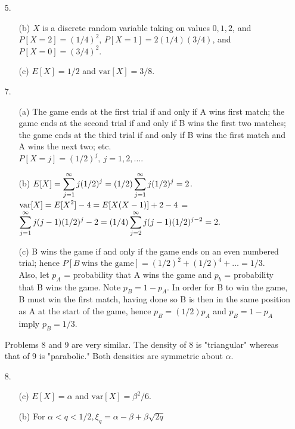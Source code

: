 \begin{enumerate}
	\item[5.] \begin{enumerate}
		
		\item[(b)] $X$ is a discrete random variable taking on values $0, 1, 2$, and $P[X=2]=(1/4)^2$, $P[X=1]= 2(1/4)(3/4)$, and $P[X=0]=(3/4)^2$. 
		
		\item[(c)] $E[X]=1/2$ and $\text{var}[X]=3/8$.
		
		\end{enumerate}
		
	\item[7.] \begin{enumerate}
		\item[(a)] The game ends at the first trial if and only if A wins first match; the game ends at the second trial if and only if B wins the first two matches; the game ends at the third trial if and only if B wins the first match and A wins the next two; etc. \\
		$P[X=j] = (1/2)^j,\ j = 1,2, \ldots.$
		
		\item[(b)] $\displaystyle E[X] = \sum_{j=1}^{\infty} j(1/2)^j = (1/2)\sum_{j=1}^\infty j(1/2)^j = 2$. \\
		$\displaystyle \text{var}[X] = E[X^2] - 4 = E[X(X-1)] +2 - 4 $ = \\ $\displaystyle  \sum_{j=1}^\infty j(j-1)(1/2)^j - 2 = (1/4)\sum_{j=2}^\infty j(j-1)(1/2)^{j-2} = 2.$  

		\item[(c)] B wins the game if and only if the game ends on an even numbered trial; hence 
		$P[B\ \text{wins the game}] = (1/2)^2 + (1/2)^4 + \ldots = 1/3$. \\
		Also, let $p_A$ = probability that A wins the game and $p_b$ = probability that B wins the game.  Note $p_B = 1-p_A$.  In order for B to win the game, B must win the first match, having done so B is then in the same position as A at the start of the game, hence $p_B = (1/2)p_A$ and $p_B=1-p_A$ imply $p_B=1/3$.  
		
		\end{enumerate}
		Problems 8 and 9 are very similar.  The density of 8 is "triangular" whereas that of 9 is "parabolic."  Both densities are symmetric about $\alpha$.
		
	\item[8.] \begin{enumerate}
		\item[(c)] $E[X] = \alpha$ and $\text{var}[X]=\beta^2/6$.
		\item[(b)] For $\alpha < q < 1/2, \xi_q  = \alpha - \beta + \beta\sqrt{2q}$
	\end{enumerate}


\end{enumerate}
